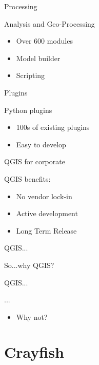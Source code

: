 \begin{frame}{Processing}
	\begin{block}{Analysis and Geo-Processing}
		\begin{itemize}
			\item Over 600 modules
			\item Model builder
			\item Scripting
		\end{itemize}
	\end{block}
\end{frame}

\begin{frame}{Plugins}
	\begin{block}{Python plugins}
		\begin{itemize}
			\item 100s of existing plugins
			\item Easy to develop
		\end{itemize}
	\end{block}
\end{frame}

\begin{frame}{QGIS for corporate}
	\begin{block}{QGIS benefits:}
		\begin{itemize}
			\item No vendor lock-in
			\item Active development
			\item Long Term Release
		\end{itemize}
	\end{block}
\end{frame}

\begin{frame}{QGIS...}
	\begin{block}{So...why QGIS?}

	\end{block}
\end{frame}

\begin{frame}{QGIS...}
	\begin{block}{... }
		\begin{itemize}
			\item Why not?
		\end{itemize}
	\end{block}
\end{frame}

\section{Crayfish}
